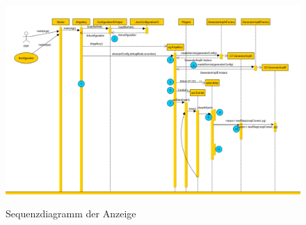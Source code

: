 \documentclass[../mciAusarbeitung.tex]{subfiles}
\begin{document}
	\begin{figure}
	\begin{sideways}
    \centering
    \label{Architektur_Anzeige_Abbildung}
    \includegraphics[width=0.95\textheight]{"img/anzeige.png"}
	\end{sideways}
	\caption[Sequenzdiagramm der Anzeige]{Sequenzdiagramm der Anzeige}
	\label{sequence_dia}
	\end{figure}
	
\end{document}
